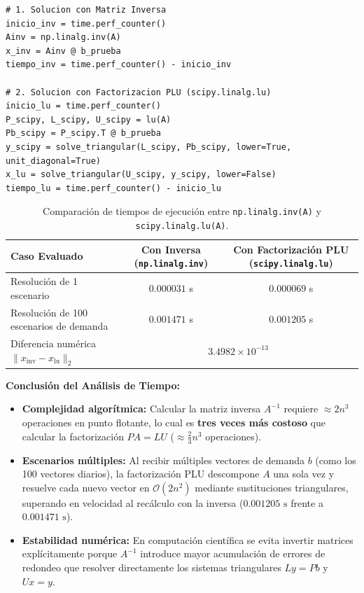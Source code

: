 \documentclass[11pt,a4paper]{article}
\begin{document}
\begin{lstlisting}
# 1. Solucion con Matriz Inversa
inicio_inv = time.perf_counter()
Ainv = np.linalg.inv(A)
x_inv = Ainv @ b_prueba
tiempo_inv = time.perf_counter() - inicio_inv

# 2. Solucion con Factorizacion PLU (scipy.linalg.lu)
inicio_lu = time.perf_counter()
P_scipy, L_scipy, U_scipy = lu(A)
Pb_scipy = P_scipy.T @ b_prueba
y_scipy = solve_triangular(L_scipy, Pb_scipy, lower=True, unit_diagonal=True)
x_lu = solve_triangular(U_scipy, y_scipy, lower=False)
tiempo_lu = time.perf_counter() - inicio_lu
\end{lstlisting}

\begin{table}[h!]
    \centering
    \caption{Comparación de tiempos de ejecución entre \texttt{np.linalg.inv(A)} y \texttt{scipy.linalg.lu(A)}.}
    \begin{tabular}{lcc}
        \toprule
        \textbf{Caso Evaluado} & \textbf{Con Inversa (\texttt{np.linalg.inv})} & \textbf{Con Factorización PLU (\texttt{scipy.linalg.lu})} \\
        \midrule
        Resolución de 1 escenario & $0.000031$ s & $0.000069$ s \\
        Resolución de 100 escenarios de demanda & $0.001471$ s & $0.001205$ s \\
        Diferencia numérica $\|x_{\text{inv}} - x_{\text{lu}}\|_2$ & \multicolumn{2}{c}{$3.4982 \times 10^{-13}$} \\
        \bottomrule
    \end{tabular}
\end{table}

\noindent\textbf{Conclusión del Análisis de Tiempo:}
\begin{itemize}[leftmargin=*]
    \item \textbf{Complejidad algorítmica:} Calcular la matriz inversa $A^{-1}$ requiere $\approx 2n^3$ operaciones en punto flotante, lo cual es \textbf{tres veces más costoso} que calcular la factorización $PA = LU$ ($\approx \frac{2}{3}n^3$ operaciones).
    \item \textbf{Escenarios múltiples:} Al recibir múltiples vectores de demanda $b$ (como los 100 vectores diarios), la factorización PLU descompone $A$ una sola vez y resuelve cada nuevo vector en $\mathcal{O}(2n^2)$ mediante sustituciones triangulares, superando en velocidad al recálculo con la inversa ($0.001205\text{ s}$ frente a $0.001471\text{ s}$).
    \item \textbf{Estabilidad numérica:} En computación científica se evita invertir matrices explícitamente porque $A^{-1}$ introduce mayor acumulación de errores de redondeo que resolver directamente los sistemas triangulares $Ly = Pb$ y $Ux = y$.
\end{itemize}
\end{document}
